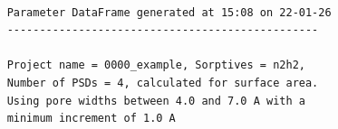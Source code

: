\begin{appendices}
\begin{figure}[h]
\begin{verbatim}
    \end{verbatim}
    \label{fig:loading_report}
    
    \centering
    \begin{verbatim}
    
    Parameter DataFrame generated at 15:08 on 22-01-26 
    ------------------------------------------------
    
    Project name = 0000_example, Sorptives = n2h2,
    Number of PSDs = 4, calculated for surface area.
    Using pore widths between 4.0 and 7.0 A with a 
    minimum increment of 1.0 A
                
    \end{verbatim}
    \label{fig:psd_report}
\end{figure}

\end{appendices}


